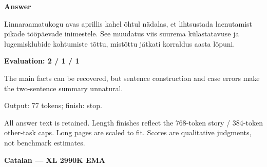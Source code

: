 \documentclass[10pt]{article}
\begin{document}
{\begin{minipage}{\textwidth}
\textbf{Answer}\par Linnaraamatukogu avas aprillis kahel õhtul nädalas, et lihtsustada laenutamist pikade tööpäevade inimestele. See muudatus viis suurema külastatavuse ja lugemisklubide kohtumiste tõttu, mistõttu jätkati korraldus aasta lõpuni.\par\smallskip
\textbf{Evaluation: 2 / 1 / 1}\par The main facts can be recovered, but sentence construction and case errors make the two-sentence summary unnatural.
\par {\color{gray} Output: 77 tokens; finish: stop.}\par
\medskip\footnotesize All answer text is retained. Length finishes reflect the 768-token story / 384-token other-task caps. Long pages are scaled to fit. Scores are qualitative judgments, not benchmark estimates.
\end{minipage}}%
\noindent\ifdim\dimexpr\ht\languagepage+\dp\languagepage\relax>0.93\textheight%
\resizebox*{!}{0.93\textheight}{\usebox{\languagepage}}%
\else\usebox{\languagepage}\fi%
\clearpage
{\Large\bfseries Catalan --- XL 2990K EMA}\par\smallskip
\end{document}
